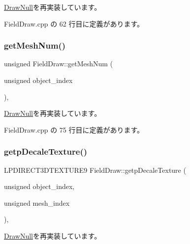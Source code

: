 \mbox{\hyperlink{class_draw_null_afe50f6fd820b18d673f70f048743f339}{Draw\+Null}}を再実装しています。



 Field\+Draw.\+cpp の 62 行目に定義があります。

\mbox{\label{class_field_draw_a0894ddd73716f0db8ceed4b7d89f23fd}} 
\subsubsection{\texorpdfstring{get\+Mesh\+Num()}{getMeshNum()}}
{\footnotesize\ttfamily unsigned Field\+Draw\+::get\+Mesh\+Num (\begin{DoxyParamCaption}\item[{unsigned}]{object\+\_\+index }\end{DoxyParamCaption})\hspace{0.3cm}{\ttfamily [override]}, {\ttfamily [virtual]}}



\mbox{\hyperlink{class_draw_null_a7586cc78eed6bcaf2972ad7a6a70e665}{Draw\+Null}}を再実装しています。



 Field\+Draw.\+cpp の 75 行目に定義があります。

\mbox{\label{class_field_draw_a77cef7390fbe8fc68c0b325f4fcc839f}} 
\subsubsection{\texorpdfstring{getp\+Decale\+Texture()}{getpDecaleTexture()}}
{\footnotesize\ttfamily L\+P\+D\+I\+R\+E\+C\+T3\+D\+T\+E\+X\+T\+U\+R\+E9 Field\+Draw\+::getp\+Decale\+Texture (\begin{DoxyParamCaption}\item[{unsigned}]{object\+\_\+index,  }\item[{unsigned}]{mesh\+\_\+index }\end{DoxyParamCaption})\hspace{0.3cm}{\ttfamily [override]}, {\ttfamily [virtual]}}



\mbox{\hyperlink{class_draw_null_a2dfa2d2cbb66249f933420a38e9cadad}{Draw\+Null}}を再実装しています。



